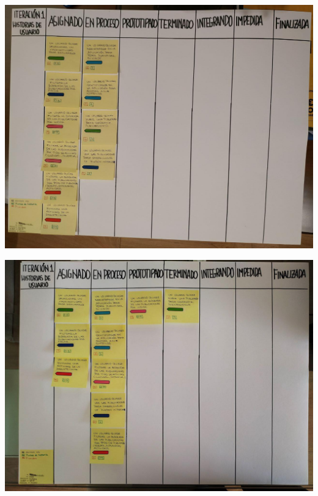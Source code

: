 \documentclass[spanish]{beamer}
\begin{document}
\begin{frame}
	\begin{center}
		\includegraphics[angle=90, scale=0.32]{papel1_1}
	\end{center}
\end{frame}


\begin{frame}
	\begin{center}
		\includegraphics[angle=90, scale=0.335]{papel1_5}
	\end{center}
\end{frame}
\end{document}
